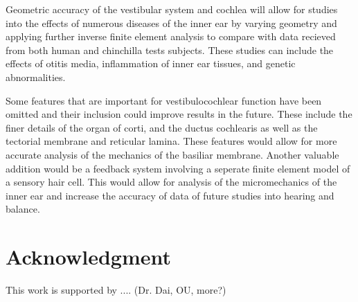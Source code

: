 \documentclass[12pt]{article}
\begin{document}
Geometric accuracy of the vestibular system and cochlea will allow for studies into the effects of numerous diseases of the inner ear by varying geometry and applying further inverse finite element analysis to compare with data recieved from both human and chinchilla tests subjects. These studies can include the effects of otitis media, inflammation of inner ear tissues, and genetic abnormalities.

Some features that are important for vestibulocochlear function have been omitted and their inclusion could improve results in the future. These include the finer details of the organ of corti, and the ductus cochlearis as well as the tectorial membrane and reticular lamina. These features would allow for more accurate analysis of the mechanics of the basiliar membrane. Another valuable addition would be a feedback system involving a seperate finite element model of a sensory hair cell. This would allow for analysis of the micromechanics of the inner ear and increase the accuracy of data of future studies into hearing and balance. \cite{choi}

\section{Acknowledgment}
This work is supported by .... (Dr. Dai, OU, more?)



\end{document}
